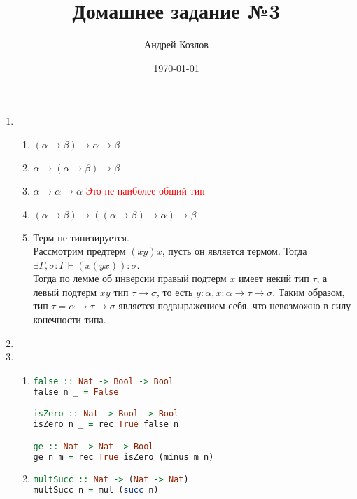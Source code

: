 \documentclass[12pt,a4paper]{article}
\begin{document}
\title{Домашнее задание №3}
\author{Андрей Козлов}
\date{\today}

\maketitle

\begin{enumerate}
\item {
	\begin{enumerate}
		\item $(\alpha \rightarrow \beta) \rightarrow \alpha \rightarrow \beta$
		\item $\alpha \rightarrow (\alpha \rightarrow \beta) \rightarrow \beta$
		\item $\alpha \rightarrow \alpha \rightarrow \alpha$
            \textcolor{red}{Это не наиболее общий тип}
		\item $(\alpha \rightarrow \beta) \rightarrow ((\alpha \rightarrow \beta) \rightarrow \alpha) \rightarrow \beta$
		\item {
			Терм не типизируется.\\
			Рассмотрим предтерм $(x y) x$, пусть он является термом. Тогда $\exists \Gamma, \sigma \colon \Gamma \vdash (x (y x)) \colon \sigma$.\\
			Тогда по лемме об инверсии правый подтерм $x$ имеет некий тип $\tau$, а левый подтерм $x y$ тип $\tau \rightarrow \sigma$, то есть $y \colon \alpha, x \colon \alpha \rightarrow \tau \rightarrow \sigma$. Таким образом, тип $\tau =  \alpha \rightarrow \tau \rightarrow \sigma$ является подвыражением себя, что невозможно в силу конечности типа.
		}
	\end{enumerate}
}
\item
\item
{
	\begin{enumerate}
		\item {
			\begin{lstlisting}[language=Haskell]
false :: Nat -> Bool -> Bool
false n _ = False

isZero :: Nat -> Bool -> Bool
isZero n _ = rec True false n

ge :: Nat -> Nat -> Bool
ge n m = rec True isZero (minus m n)
			\end{lstlisting}
		}
		\item {
			\begin{lstlisting}[language=Haskell]
multSucc :: Nat -> (Nat -> Nat)
multSucc n = mul (succ n)


\end{lstlisting}}
\end{enumerate}}
\end{enumerate}
\end{document}
